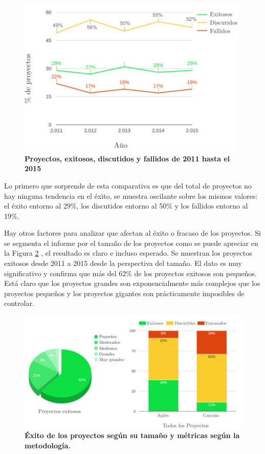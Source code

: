 
\begin{figure}[h]
\includegraphics[width=11cm]{Img/Desarrollo/caos0.png}
\centering
\caption{\textbf{ \footnotesize{Proyectos, exitosos, discutidos y fallidos de 2011 hasta el 2015}}}
\label{fig:caos0}
\end{figure}

Lo primero que sorprende de esta comparativa es que del total de proyectos no hay ninguna tendencia en el éxito, se muestra oscilante sobre los mismos valores: el éxito entorno al 29\%, los discutidos entorno al 50\% y los fallidos entorno al 19\%. 

Hay otros factores para analizar que afectan al éxito o fracaso de los proyectos. Si se segmenta el informe por el tamaño de los proyectos como se puede apreciar en la Figura \ref{fig:caos1} , el resultado es claro e incluso esperado.
Se muestran los proyectos exitosos desde 2011 a 2015 desde la perspectiva del tamaño. El dato es muy significativo y confirma que más del 62\% de los proyectos exitosos son pequeños. Está claro que los proyectos grandes son exponencialmente más complejos que los proyectos pequeños y los proyectos gigantes son prácticamente imposibles de controlar.

\begin{figure}[h]
\includegraphics[width=15cm]{Img/Desarrollo/caos1.png}
\centering
\caption{\textbf{ \footnotesize{Éxito de los proyectos según su tamaño y métricas según la metodología.}}}
\label{fig:caos1}
\end{figure}

